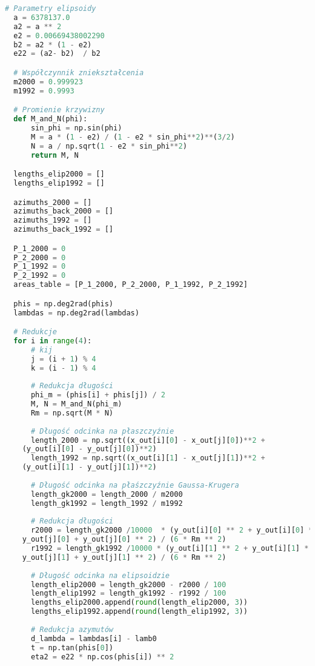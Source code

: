\documentclass[fleqn,10pt,a4paper]{article}
\begin{document}
\begin{lstlisting}[language=Python, caption=Redukcje odległości i azymutów, label = kod:redukcje, style=mycode]
  # Parametry elipsoidy 
  a = 6378137.0 
  a2 = a ** 2
  e2 = 0.00669438002290
  b2 = a2 * (1 - e2)
  e22 = (a2- b2)  / b2

  # Współczynnik zniekształcenia
  m2000 = 0.999923
  m1992 = 0.9993

  # Promienie krzywizny
  def M_and_N(phi):
      sin_phi = np.sin(phi)
      M = a * (1 - e2) / (1 - e2 * sin_phi**2)**(3/2)
      N = a / np.sqrt(1 - e2 * sin_phi**2)
      return M, N

  lengths_elip2000 = []
  lengths_elip1992 = []

  azimuths_2000 = []
  azimuths_back_2000 = []
  azimuths_1992 = []
  azimuths_back_1992 = []

  P_1_2000 = 0
  P_2_2000 = 0
  P_1_1992 = 0
  P_2_1992 = 0
  areas_table = [P_1_2000, P_2_2000, P_1_1992, P_2_1992]

  phis = np.deg2rad(phis)
  lambdas = np.deg2rad(lambdas)

  # Redukcje
  for i in range(4):
      # kij
      j = (i + 1) % 4
      k = (i - 1) % 4
  
      # Redukcja długości 
      phi_m = (phis[i] + phis[j]) / 2
      M, N = M_and_N(phi_m)
      Rm = np.sqrt(M * N)
  
      # Długość odcinka na płaszczyźnie
      length_2000 = np.sqrt((x_out[i][0] - x_out[j][0])**2 + 
    (y_out[i][0] - y_out[j][0])**2)
      length_1992 = np.sqrt((x_out[i][1] - x_out[j][1])**2 + 
    (y_out[i][1] - y_out[j][1])**2)
  
      # Długość odcinka na płaśzczyźnie Gaussa-Krugera
      length_gk2000 = length_2000 / m2000
      length_gk1992 = length_1992 / m1992
  
      # Redukcja długości
      r2000 = length_gk2000 /10000  * (y_out[i][0] ** 2 + y_out[i][0] * 
    y_out[j][0] + y_out[j][0] ** 2) / (6 * Rm ** 2)
      r1992 = length_gk1992 /10000 * (y_out[i][1] ** 2 + y_out[i][1] * 
    y_out[j][1] + y_out[j][1] ** 2) / (6 * Rm ** 2)
  
      # Długość odcinka na elipsoidzie
      length_elip2000 = length_gk2000 - r2000 / 100
      length_elip1992 = length_gk1992 - r1992 / 100
      lengths_elip2000.append(round(length_elip2000, 3))
      lengths_elip1992.append(round(length_elip1992, 3))
  
      # Redukcja azymutów
      d_lambda = lambdas[i] - lamb0
      t = np.tan(phis[0])
      eta2 = e22 * np.cos(phis[i]) ** 2
  

\end{lstlisting}
\end{document}
